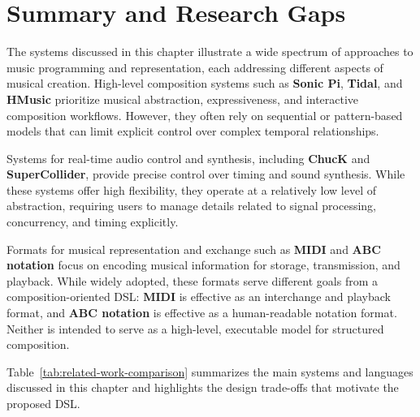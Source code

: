 \section{Summary and Research Gaps}\label{sec:summary-and-research-gaps}

The systems discussed in this chapter illustrate a wide spectrum of approaches to music programming and representation,
each addressing different aspects of musical creation.
High-level composition systems such as \textbf{Sonic Pi}, \textbf{Tidal}, and \textbf{HMusic} prioritize musical
abstraction, expressiveness, and interactive composition workflows.
However, they often rely on sequential or pattern-based models that can limit explicit control over complex temporal
relationships.

Systems for real-time audio control and synthesis, including \textbf{ChucK} and \textbf{SuperCollider}, provide precise
control over timing and sound synthesis.
While these systems offer high flexibility, they operate at a relatively low level of abstraction, requiring users to
manage details related to signal processing, concurrency, and timing explicitly.

Formats for musical representation and exchange such as \textbf{MIDI} and \textbf{ABC notation} focus on encoding
musical information for storage, transmission, and playback.
While widely adopted, these formats serve different goals from a composition-oriented DSL: \textbf{MIDI} is effective
as an interchange and playback format, and \textbf{ABC notation} is effective as a human-readable notation format.
Neither is intended to serve as a high-level, executable model for structured composition.

Table~\ref{tab:related-work-comparison} summarizes the main systems and languages discussed in this chapter and
highlights the design trade-offs that motivate the proposed DSL\@.


